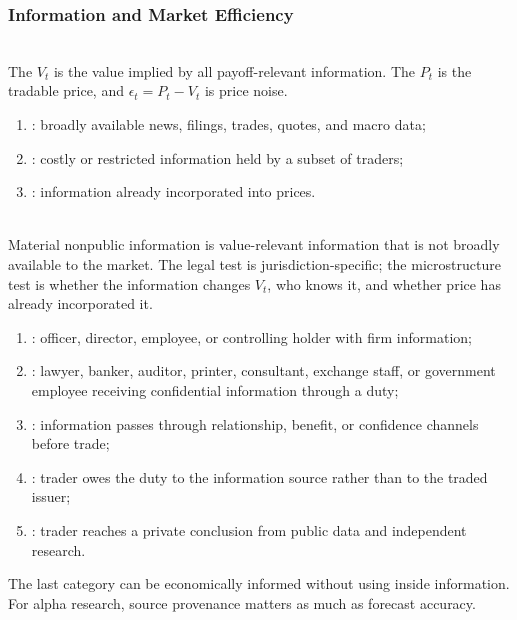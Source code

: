 \subsubsection{Information and Market Efficiency}

\begin{definition} \\
The  $V_t$ is the value implied by all payoff-relevant information. The  $P_t$ is the tradable price, and $\epsilon_t=P_t-V_t$ is price noise.
\end{definition}

\begin{taxonomy} 
\begin{enumerate}[label=\roman*.]
\setlength{\itemsep}{0pt}
\item {}: broadly available news, filings, trades, quotes, and macro data;
\item {}: costly or restricted information held by a subset of traders;
\item {}: information already incorporated into prices.
\end{enumerate}
\end{taxonomy}

\begin{definition} \\
Material nonpublic information is value-relevant information that is not broadly available to the market. The legal test is jurisdiction-specific; the microstructure test is whether the information changes $V_t$, who knows it, and whether price has already incorporated it.
\end{definition}

\begin{taxonomy} 
\begin{enumerate}[label=\roman*.]
\setlength{\itemsep}{0pt}
\item {}: officer, director, employee, or controlling holder with firm information;
\item {}: lawyer, banker, auditor, printer, consultant, exchange staff, or government employee receiving confidential information through a duty;
\item {}: information passes through relationship, benefit, or confidence channels before trade;
\item {}: trader owes the duty to the information source rather than to the traded issuer;
\item {}: trader reaches a private conclusion from public data and independent research.
\end{enumerate}
The last category can be economically informed without using inside information. For alpha research, source provenance matters as much as forecast accuracy.
\end{taxonomy}

